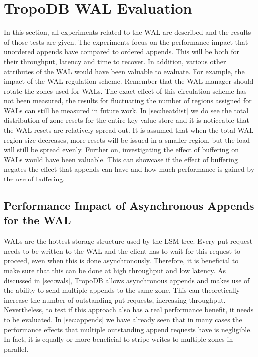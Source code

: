 \section{TropoDB WAL Evaluation}
\label{sec:waleval}
In this section, all experiments related to the WAL are described and the results of those tests are given. The experiments focus on the performance impact that unordered appends have compared to ordered appends. This will be both for their throughput, latency and time to recover. In addition, various other attributes of the WAL would have been valuable to evaluate. For example, the impact of the WAL regulation scheme. Remember that the WAL manager should rotate the zones used for WALs. The exact effect of this circulation scheme has not been measured, the results for fluctuating the number of regions assigned for WALs can still be measured in future work. In \autoref{sec:heatdist} we do see the total distribution of zone resets for the entire key-value store and it is noticeable that the WAL resets are relatively spread out. It is assumed that when the total WAL region size decreases, more resets will be issued in a smaller region, but the load will still be spread evenly. Further on, investigating the effect of buffering on WALs would have been valuable. This can showcase if the effect of buffering negates the effect that appends can have and how much performance is gained by the use of buffering.  

\subsection{Performance Impact of Asynchronous Appends for the WAL}
\label{sec:walexperimentappend}
WALs are the hottest storage structure used by the LSM-tree. Every put request needs to be written to the WAL and the client has to wait for this request to proceed, even when this is done asynchronously. Therefore, it is beneficial to make sure that this can be done at high throughput and low latency. As discussed in \autoref{sec:wals}, TropoDB allows asynchronous appends and makes use of the ability to send multiple appends to the same zone. This can theoretically increase the number of outstanding put requests, increasing throughput. Nevertheless, to test if this approach also has a real performance benefit, it needs to be evaluated. In \autoref{sec:appends} we have already seen that in many cases the performance effects that multiple outstanding append requests have is negligible. In fact, it is equally or more beneficial to stripe writes to multiple zones in parallel. 

